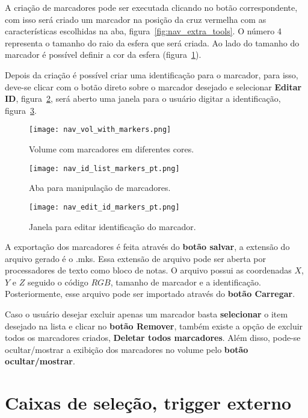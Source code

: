 A criação de marcadores pode ser executada clicando no botão correspondente, com isso será criado um marcador na posição da cruz vermelha com as características escolhidas na aba, figura~\ref{fig:nav_extra_tools}. O número 4 representa o tamanho do raio da esfera que será criada. Ao lado do tamanho do marcador é possível definir a cor da esfera (figura~\ref{fig:nav_vol_with_markers}). 

Depois da criação é possível criar uma identificação para o marcador, para isso, deve-se clicar com o botão direto sobre o marcador desejado e selecionar \textbf{Editar ID}, figura~\ref{fig:nav_id_list_markers}, será aberto uma janela para o usuário digitar a identificação, figura~\ref{fig:nav_edit_id_markers}.


\begin{figure}[!htb]
\centering
\texttt{[image: nav\_vol\_with\_markers.png]}
\caption{Volume com marcadores em diferentes cores.}
\label{fig:nav_vol_with_markers}
\end{figure} 


\begin{figure}[!htb]
\centering
\texttt{[image: nav\_id\_list\_markers\_pt.png]}
\caption{Aba para manipulação de marcadores.}
\label{fig:nav_id_list_markers}
\end{figure} 

\begin{figure}[!htb]
\centering
\texttt{[image: nav\_edit\_id\_markers\_pt.png]}
\caption{Janela para editar identificação do marcador.}
\label{fig:nav_edit_id_markers}
\end{figure} 

A exportação dos marcadores é feita através do \textbf{botão salvar}, a extensão do arquivo gerado é o .mks. Essa extensão de arquivo pode ser aberta por processadores de texto como bloco de notas. O arquivo possui as coordenadas $X$, $Y$ e $Z$ seguido o código $RGB$, tamanho de marcador e a identificação. Posteriormente, esse arquivo pode ser importado através do \textbf{botão Carregar}.

Caso o usuário desejar excluir apenas um marcador basta \textbf{selecionar} o item desejado na lista e clicar no \textbf{botão Remover}, também existe a opção de excluir todos os marcadores criados, \textbf{Deletar todos marcadores}. Além disso, pode-se ocultar/mostrar a exibição dos marcadores no volume pelo \textbf{botão ocultar/mostrar}.

\section{Caixas de seleção, trigger externo}

